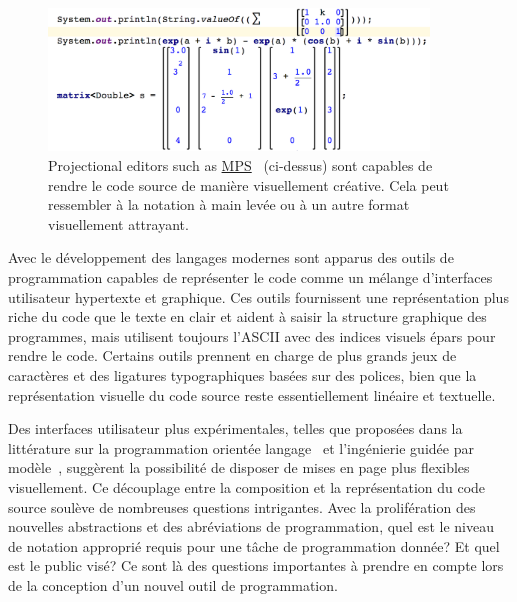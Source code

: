 \begin{figure}
\centering
\includegraphics[width=0.90\textwidth]{../figures/mps_screenshot.png}
\caption{Projectional editors such as \href{https://www.jetbrains.com/mps/}{MPS}~\citep{voelter2010language, pech2013jetbrains} (ci-dessus) sont capables de rendre le code source de manière visuellement créative. Cela peut ressembler à la notation à main levée ou à un autre format visuellement attrayant.}
\label{fig:mps_screenshot}
\end{figure}

Avec le développement des langages modernes sont apparus des outils de programmation capables de représenter le code comme un mélange d'interfaces utilisateur hypertexte et graphique. Ces outils fournissent une représentation plus riche du code que le texte en clair et aident à saisir la structure graphique des programmes, mais utilisent toujours l'ASCII avec des indices visuels épars pour rendre le code. Certains outils prennent en charge de plus grands jeux de caractères et des ligatures typographiques basées sur des polices, bien que la représentation visuelle du code source reste essentiellement linéaire et textuelle.

Des interfaces utilisateur plus expérimentales, telles que proposées dans la littérature sur la programmation orientée langage~\citep{dmitriev2004language} et l'ingénierie guidée par modèle~\citep{famelis2015mummint}, suggèrent la possibilité de disposer de mises en page plus flexibles visuellement. Ce découplage entre la composition et la représentation du code source soulève de nombreuses questions intrigantes. Avec la prolifération des nouvelles abstractions et des abréviations de programmation, quel est le niveau de notation approprié requis pour une tâche de programmation donnée? Et quel est le public visé? Ce sont là des questions importantes à prendre en compte lors de la conception d'un nouvel outil de programmation.

